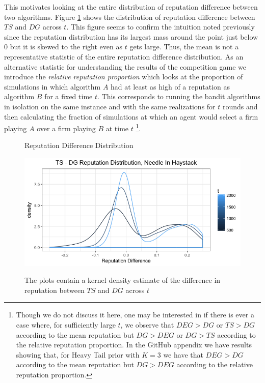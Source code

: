 \documentclass{article}
\theoremstyle{definition}
\begin{document}
This motivates looking at the entire distribution of reputation difference between two algorithms. Figure \ref{ts_dg_rep_diff_nih} shows the distribution of reputation difference between $TS$ and $DG$ across $t$. This figure seems to confirm the intuition noted previously since the reputation distribution has its largest mass around the point just below 0 but it is skewed to the right even as $t$ gets large. Thus, the mean is not a representative statistic of the entire reputation difference distribution. As an alternative statistic for understanding the results of the competition game we introduce the \textit{relative reputation proportion} which looks at the proportion of simulations in which algorithm $A$ had at least as high of a reputation as algorithm $B$ for a fixed time $t$. This corresponds to running the bandit algorithms in isolation on the same instance and with the same realizations for $t$ rounds and then calculating the fraction of simulations at which an agent would select a firm playing $A$ over a firm playing $B$ at time $t$ \footnote{Though we do not discuss it here, one may be interested in if there is ever a case where, for sufficiently large $t$, we observe that $DEG >DG$ or $TS > DG$ according to the mean reputation but $DG > DEG$ or $DG > TS$ according to the relative reputation proportion. In the GitHub appendix we have results showing that, for Heavy Tail prior with $K=3$ we have that $DEG > DG$ according to the mean reputation but $DG > DEG$ according to the relative reputation proportion.}.

\begin{figure}
\caption{Reputation Difference Distribution}
\includegraphics[scale=0.35]{figures/ts_dg_rep_diff_nih}
\label{ts_dg_rep_diff_nih}
\caption*{\tiny{The plots contain a kernel density estimate of the difference in reputation between $TS$ and $DG$ across $t$}}
\end{figure}
\end{document}

